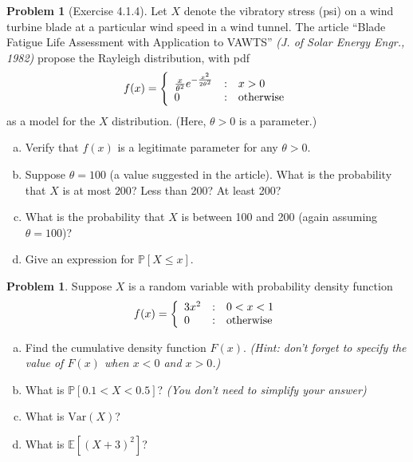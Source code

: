 \documentclass[10pt]{article}
\theoremstyle{definition}
\newtheorem{problem}[theorem]{Problem}
\newcommand{\1}[1]{\textbf{1}_{\left[#1\right]}} %
\def\E{\mathbb{E}} %
\def\P{\mathbb{P}} %
\def\Var{\mathrm{Var}} %
\begin{document}
\begin{problem}[Exercise 4.1.4]
  Let $X$ denote the vibratory stress (psi) on a wind turbine blade at a
  particular wind speed in a wind tunnel. The article ``Blade Fatigue Life Assessment with
  Application to VAWTS'' \textit{(J. of Solar Energy Engr., 1982)} propose the Rayleigh
  distribution, with pdf
  \begin{equation*}
    f(x) = \left\{ \begin{array}{l@{\quad:\quad}l} \frac{x}{\theta^{2}}e^{-\frac{x^{2}}{2\theta^{2}}} & x>0\\ 0& \text{otherwise}\end{array}\right.
  \end{equation*}
  as a model for the $X$ distribution. (Here, $\theta>0$ is a parameter.)
  \begin{enumerate}[(a)]
    \item Verify that $f(x)$ is a legitimate parameter for any $\theta>0$.
    \item Suppose $\theta=100$ (a value suggested in the article). What is the
    probability that $X$ is at most $200$? Less than 200? At least 200?
    \item What is the probability that $X$ is between 100 and 200 (again
    assuming $\theta=100$)?
    \item Give an expression for $\P\left[X \leq x\right]$.
  \end{enumerate}
\end{problem}

\begin{problem}%
  Suppose $X$ is a random variable with probability density function
  \begin{equation*}
    f(x) = \left\{ \begin{array}{l@{\quad:\quad}l} 3x^{2} &0<x<1 \\ 0& \text{otherwise}\end{array}\right.
  \end{equation*}
  \begin{enumerate}[(a)]
    \item Find the cumulative density function $F(x)$. \textit{(Hint: don't forget to specify the value of $F(x)$ when $x<0$ and $x>0$.)}
    \item What is $\P\left[0.1<X<0.5 \right]$? \textit{(You don't need to simplify your answer)}
    \item What is $\Var(X)$?
    \item What is $\E\left[(X+3)^{2} \right]$?
  \end{enumerate}
\end{problem}
\end{document}
